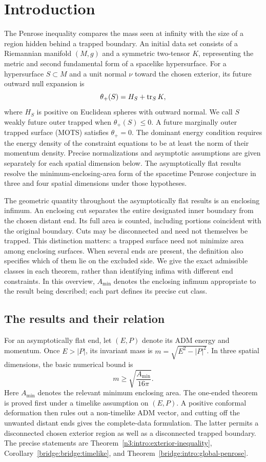 \section{Introduction}\label{intro:overview}

The Penrose inequality compares the mass seen at infinity with the size
of a region hidden behind a trapped boundary. An initial data set
consists of a Riemannian manifold $(M,g)$ and a symmetric two-tensor $K$,
representing the metric and second fundamental form of a spacelike
hypersurface. For a hypersurface $S\subset M$ and a unit normal $\nu$
toward the chosen exterior, its future outward null expansion is
\[
                 \theta_+(S)=H_S+\operatorname{tr}_S K,
\]
where $H_S$ is positive on Euclidean spheres with outward normal.
We call $S$ weakly future outer trapped when $\theta_+(S)\le0$.
A future marginally outer trapped surface (MOTS) satisfies $\theta_+=0$.
The dominant energy condition requires the energy density of the
constraint equations to be at least the norm of their momentum density.
Precise normalizations and asymptotic assumptions are given separately
for each spatial dimension below. The asymptotically flat results resolve
the minimum-enclosing-area form of the spacetime Penrose conjecture in
three and four spatial dimensions under those hypotheses.

The geometric quantity throughout the asymptotically flat results is
an enclosing infimum. An enclosing cut separates the entire designated
inner boundary from the chosen distant end. Its full area is counted,
including portions coincident with the original boundary. Cuts may be
disconnected and need not themselves be trapped. This distinction matters:
a trapped surface need not minimize area among enclosing surfaces.
When several ends are present, the definition also specifies which of
them lie on the excluded side. We give the exact admissible classes in
each theorem, rather than identifying infima with different end constraints.
In this overview, $A_{\min}$ denotes the enclosing infimum appropriate
to the result being described; each part defines its precise cut class.

\subsection{The results and their relation}

For an asymptotically flat end, let $(E,P)$ denote its ADM energy and
momentum. Once $E>|P|$, its invariant mass is
$m=\sqrt{E^2-|P|^2}$. In three spatial dimensions, the basic numerical
bound is
\[
                     m\ge\sqrt{\frac{A_{\min}}{16\pi}}.
\]
Here $A_{\min}$ denotes the relevant minimum enclosing area.
The one-ended theorem is proved first under a timelike assumption on
$(E,P)$. A positive conformal deformation then rules out a non-timelike
ADM vector, and cutting off the unwanted distant ends gives the
complete-data formulation. The latter permits a disconnected chosen
exterior region as well as a disconnected trapped boundary.
The precise statements are
Theorem~\ref{n3:intro:exterior-inequality},
Corollary~\ref{bridge:bridge:timelike}, and
Theorem~\ref{bridge:intro:global-penrose}.


